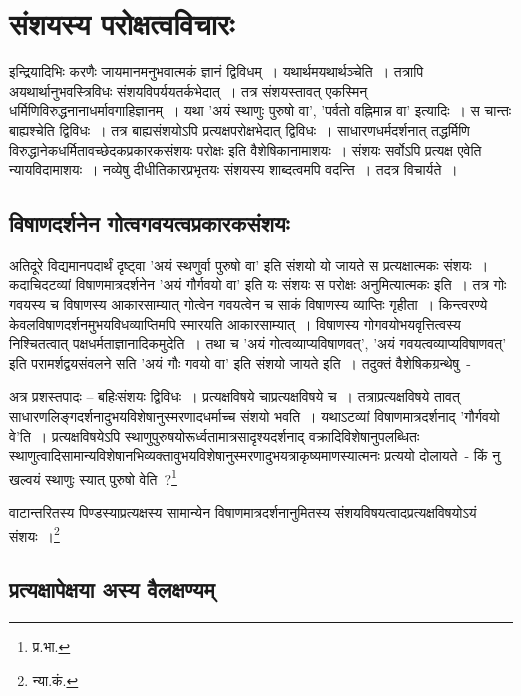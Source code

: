 	\section{संशयस्य परोक्षत्वविचारः}

	इन्द्रियादिभिः करणैः जायमानमनुभवात्मकं ज्ञानं द्विविधम्~। यथार्थमयथार्थञ्चेति~। तत्रापि अयथार्थानुभवस्त्रिविधः संशयविपर्ययतर्कभेदात्~। तत्र संशयस्तावत् एकस्मिन् धर्मिणिविरुद्धनानाधर्मावगाहिज्ञानम्~। यथा 'अयं स्थाणुः पुरुषो वा', 'पर्वतो वह्निमान्न वा' इत्यादिः~। स चान्तः बाह्यश्चेति द्विविधः~। तत्र बाह्यसंशयोऽपि प्रत्यक्षपरोक्षभेदात् द्विविधः~। साधारणधर्मदर्शनात् तद्धर्मिणि विरुद्धानेकधर्मितावच्छेदकप्रकारकसंशयः परोक्षः इति वैशेषिकानामाशयः~। संशयः सर्वोऽपि प्रत्यक्ष एवेति न्यायविदामाशयः~। नव्येषु दीधीतिकारप्रभृतयः संशयस्य शाब्दत्वमपि वदन्ति~। तदत्र विचार्यते~।

		\subsection{विषाणदर्शनेन गोत्वगवयत्वप्रकारकसंशयः}

		अतिदूरे विद्यमानपदार्थं दृष्ट्वा 'अयं स्थणुर्वा पुरुषो वा' इति संशयो यो जायते स प्रत्यक्षात्मकः संशयः~। कदाचिदटव्यां विषाणमात्रदर्शनेन 'अयं गौर्गवयो वा' इति यः संशयः स परोक्षः अनुमित्यात्मकः इति~। तत्र गोः गवयस्य च विषाणस्य आकारसाम्यात् गोत्वेन गवयत्वेन च साकं विषाणस्य व्याप्तिः गृहीता~। किन्त्वरण्ये केवलविषाणदर्शनमुभयविधव्याप्तिमपि स्मारयति आकारसाम्यात्~। विषाणस्य गोगवयोभयवृत्तित्वस्य निश्चितत्वात् पक्षधर्मताज्ञानादिकमुदेति~। तथा च 'अयं गोत्वव्याप्यविषाणवत्', 'अयं गवयत्वव्याप्यविषाणवत्' इति परामर्शद्वयसंवलने सति 'अयं गौः गवयो वा' इति संशयो जायते इति~। तदुक्तं वैशेषिकग्रन्थेषु~-

		{\fontsize{11.7}{0}\selectfont\s अत्र प्रशस्तपादः – बहिःसंशयः द्विविधः~। प्रत्यक्षविषये चाप्रत्यक्षविषये च~। तत्राप्रत्यक्षविषये तावत् साधारणलिङ्गदर्शनादुभयविशेषानुस्मरणादधर्माच्च संशयो भवति~। यथाऽटव्यां विषाणमात्रदर्शनाद् 'गौर्गवयो वे'ति~। प्रत्यक्षविषयेऽपि स्थाणुपुरुषयोरूर्ध्वतामात्रसादृश्यदर्शनाद् वक्रादिविशेषानुपलब्धितः स्थाणुत्वादिसामान्यविशेषानभिव्यक्तावुभयविशेषानुस्मरणादुभयत्राकृष्यमाणस्यात्मनः प्रत्ययो दोलायते~-  किं नु खल्वयं स्थाणुः स्यात् पुरुषो वेति~?\footnote{प्र.भा.}}

		{\fontsize{11.7}{0}\selectfont\s वाटान्तरितस्य  पिण्डस्याप्रत्यक्षस्य सामान्येन विषाणमात्रदर्शनानुमितस्य संशयविषयत्वादप्रत्यक्षविषयोऽयं संशयः~।\footnote{न्या.कं.}}

		\subsection{प्रत्यक्षापेक्षया अस्य वैलक्षण्यम्}

